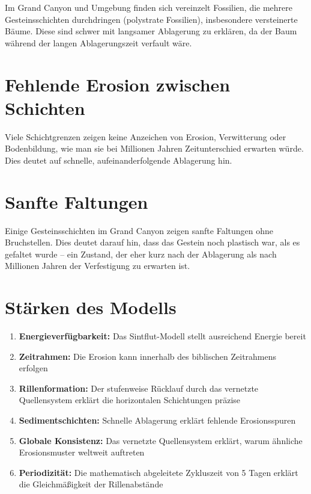 ﻿\documentclass[12pt,a4paper]{report}
\begin{document}
Im Grand Canyon und Umgebung finden sich vereinzelt Fossilien, die mehrere Gesteinsschichten durchdringen (polystrate Fossilien), insbesondere versteinerte Bäume. Diese sind schwer mit langsamer Ablagerung zu erklären, da der Baum während der langen Ablagerungszeit verfault wäre.

\section{Fehlende Erosion zwischen Schichten}

Viele Schichtgrenzen zeigen keine Anzeichen von Erosion, Verwitterung oder Bodenbildung, wie man sie bei Millionen Jahren Zeitunterschied erwarten würde. Dies deutet auf schnelle, aufeinanderfolgende Ablagerung hin.

\section{Sanfte Faltungen}

Einige Gesteinsschichten im Grand Canyon zeigen sanfte Faltungen ohne Bruchstellen. Dies deutet darauf hin, dass das Gestein noch plastisch war, als es gefaltet wurde -- ein Zustand, der eher kurz nach der Ablagerung als nach Millionen Jahren der Verfestigung zu erwarten ist.

\section{Stärken des Modells}

\begin{enumerate}
	\item \textbf{Energieverfügbarkeit:} Das Sintflut-Modell stellt ausreichend Energie bereit
	\item \textbf{Zeitrahmen:} Die Erosion kann innerhalb des biblischen Zeitrahmens erfolgen
	\item \textbf{Rillenformation:} Der stufenweise Rücklauf durch das vernetzte Quellensystem erklärt die horizontalen Schichtungen präzise
	\item \textbf{Sedimentschichten:} Schnelle Ablagerung erklärt fehlende Erosionsspuren
	\item \textbf{Globale Konsistenz:} Das vernetzte Quellensystem erklärt, warum ähnliche Erosionsmuster weltweit auftreten
	\item \textbf{Periodizität:} Die mathematisch abgeleitete Zykluszeit von 5 Tagen erklärt die Gleichmäßigkeit der Rillenabstände
\end{enumerate}
\end{document}
